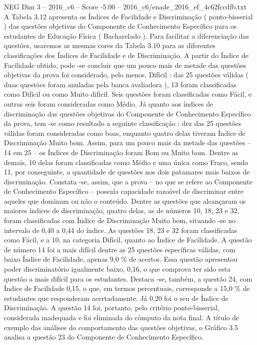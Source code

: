 \begin{textsample}{NEG Dim 3 – 2016\_c6 – Score -5.00 – 2016\_c6/enade\_2016\_ef\_4c62fccdfb.txt}
A Tabela 3.12 apresenta os Índices de Facilidade e Discriminação ( ponto-bisserial ) das questões objetivas do Componente de Conhecimento Específico para os estudantes de Educação Física ( Bacharelado ).
Para facilitar a diferenciação das questões, usaremos as mesmas cores da Tabela 3.10 para as diferentes classificações dos Índices de Facilidade e de Discriminação.
A partir do Índice de Facilidade obtido, pode -se concluir que um pouco mais de metade das questões objetivas da prova foi considerado, pelo menos, Difícil : das 25 questões válidas ( duas questões foram anuladas pela banca avaliadora ), 13 foram classificadas como Difícil ou como Muito difícil.
Seis questões foram classificadas como Fácil, e outras seis foram consideradas como Médio.
Já quanto aos índices de discriminação das questões objetivas do Componente de Conhecimento Específico da prova, tem -se como resultado a seguinte classificação : dez das 25 questões válidas foram consideradas como boas, enquanto quatro delas tiveram Índice de Discriminação Muito bom.
Assim, para um pouco mais da metade das questões – 14 em 25 – os Índices de Discriminação foram Bom ou Muito bom.
Dentre as demais, 10 delas foram classificadas como Médio e uma única como Fraco, sendo 11, por conseguinte, a quantidade de questões nos dois patamares mais baixos de discriminação.
Constata -se, assim, que a prova – no que se refere ao Componente de Conhecimento Específico – possuía capacidade razoável de discriminar entre aqueles que dominam ou não o conteúdo.
Dentre as questões que alcançaram os maiores índices de discriminação, quatro delas, as de números 10, 18, 23 e 32, foram classificadas com Índice de Discriminação Muito bom, situando -se no intervalo de 0,40 a 0,44 do índice.
As questões 18, 23 e 32 foram classificadas como Fácil, e a 10, na categoria Difícil, quanto ao Índice de Facilidade.
A questão de número 14 foi a mais difícil dentre as 25 questões específicas válidas, com baixo Índice de Facilidade, apenas 9,0 \% de acertos.
Essa questão apresentou poder discriminatório igualmente baixo, 0,16, o que comprova ter sido esta questão a mais difícil para os estudantes.
Destaca -se, também, a questão 24, com Índice de Facilidade 0,15, o que, em termos percentuais, corresponde a 15,0 \% de estudantes que responderam acertadamente.
Já 0,20 foi o seu de Índice de Discriminação.
A questão 14 foi, portanto, pelo critério ponto-bisserial, considerada inadequada e foi eliminada do cômputo da nota final.
A título de exemplo das análises do comportamento das questões objetivas, o Gráfico 3.5 analisa a questão 23 do Componente de Conhecimento Específico.

\end{textsample}
